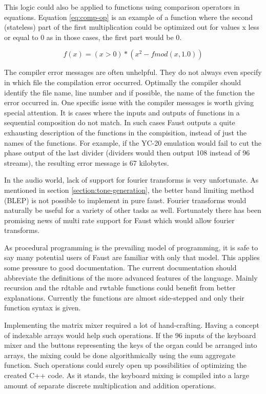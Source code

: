\documentclass[11pt,a4paper]{article}
\begin{document}
This logic could also be applied to functions using comparison operators in equations. Equation \ref{eq:comp-op} is an example of a function where the second (stateless) part of the first multiplication could be optimized out for values x less or equal to 0 as in those cases, the first part would be 0.

\begin{equation}
\label{eq:comp-op}
f(x) = (x>0) * (x^2-fmod(x,1.0))
\end{equation}


The compiler error messages are often unhelpful. They do not always even specify in which file the compilation error occurred. Optimally the compiler should identify the file name, line number and if possible, the name of the function the error occurred in. One specific issue with the compiler messages is worth giving special attention. It is cases where the inputs and outputs of functions in a sequential composition do not match. In such cases Faust outputs a quite exhausting description of the functions in the compisition, instead of just the names of the functions. For example, if the YC-20 emulation would fail to cut the phase output of the last divider (dividers would then output 108 instead of 96 streams), the resulting error message is 67 kilobytes.

In the audio world, lack of support for fourier transforms is very unfortunate. As mentioned in section \ref{section:tone-generation}, the better band limiting method (BLEP) is not possible to implement in pure faust. Fourier transforms would naturally be useful for a variety of other tasks as well. Fortunately there has been promising news of multi rate support for Faust which would allow fourier transforms.

As procedural programming is the prevailing model of programming, it is safe to say many potential users of Faust are familiar with only that model. This applies some pressure to good documentation. The current documentation should abbreviate the definitions of the more advanced features of the language. Mainly recursion and the rdtable and rwtable functions could benefit from better explanations. Currently the functions are almost side-stepped and only their function syntax is given.

Implementing the matrix mixer required a lot of hand-crafting. Having a concept of indexable arrays would help such operations. If the 96 inputs of the keyboard mixer and the buttons representing the keys of the organ could be arranged into arrays, the mixing could be done algorithmically using the sum aggregate function. Such operations could surely open up possibilities of optimizing the created C++ code. As it stands, the keyboard mixing is compiled into a large amount of separate discrete multiplication and addition operations.
\end{document}
